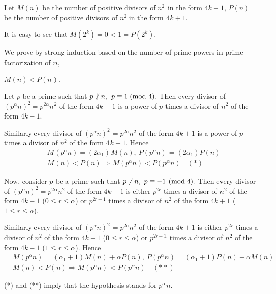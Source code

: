 \documentclass{article}
\begin{document}
\begin{soln}
    Let $M(n)$ be the number of positive divisors of $n^2$ in the form $4k-1$, $P(n)$ be the number of positive divisors of $n^2$ in the form $4k+1$. 

    It is easy to see that $M(2^k) = 0 < 1 = P(2^k).$

    We prove by strong induction based on the number of prime powers in prime factorization of $n,$
    \begin{claim*}
        $M(n) < P(n).$
    \end{claim*}
    \begin{subproof}
        Let $p$ be a prime such that $p \not |\ n,\ p \equiv 1 \ (\mathrm{mod}\ 4).$
        Then every divisor of $(p^{\alpha}n)^2 = p^{2\alpha}n^2$ of the form $4k-1$ is a power of $p$ times a divisor of $n^2$ of the form $4k-1$. 
        
        Similarly every divisor of $(p^{\alpha}n)^2 = p^{2\alpha}n^2$ of the form $4k+1$ is a power of $p$ times a divisor of $n^2$ of the form $4k+1$.
        Hence 
        \[
            \begin{aligned}
                &M(p^{\alpha}n)=(2\alpha_1)M(n),\ P(p^{\alpha}n)=(2\alpha_1)P(n)\\
                &M(n) < P(n) \Rightarrow M(p^{\alpha}n) < P(p^{\alpha}n) \quad (*)
            \end{aligned}
        \]

        Now, consider $p$ be a prime such that $p \not |\ n,\ p \equiv -1 \ (\mathrm{mod}\ 4).$
        Then every divisor of $(p^{\alpha}n)^2 = p^{2\alpha}n^2$ of the form $4k-1$ is either $p^{2r}$ times a divisor of $n^2$ of the form $4k-1$
        ($0 \le r \le \alpha$) or $p^{2r-1}$ times a divisor of $n^2$ of the form $4k+1$ ($1 \le r \le \alpha$).
        
        Similarly every divisor of $(p^{\alpha}n)^2 = p^{2\alpha}n^2$ of the form $4k+1$ is either $p^{2r}$ times a divisor of $n^2$ of the form $4k+1$
        ($0 \le r \le \alpha$) or $p^{2r-1}$ times a divisor of $n^2$ of the form $4k-1$ ($1 \le r \le \alpha$).
        Hence 
        \[
            \begin{aligned}
                &M(p^{\alpha}n)=(\alpha_1+1)M(n) + \alpha P(n),\ P(p^{\alpha}n)=(\alpha_1+1)P(n) + \alpha M(n)\\
                &M(n) < P(n) \Rightarrow M(p^{\alpha}n) < P(p^{\alpha}n) \quad (**)
            \end{aligned}
        \]

        (*) and (**) imply that the hypothesis stands for $p^{\alpha}n.$
    \end{subproof}
\end{soln}
\end{document}
